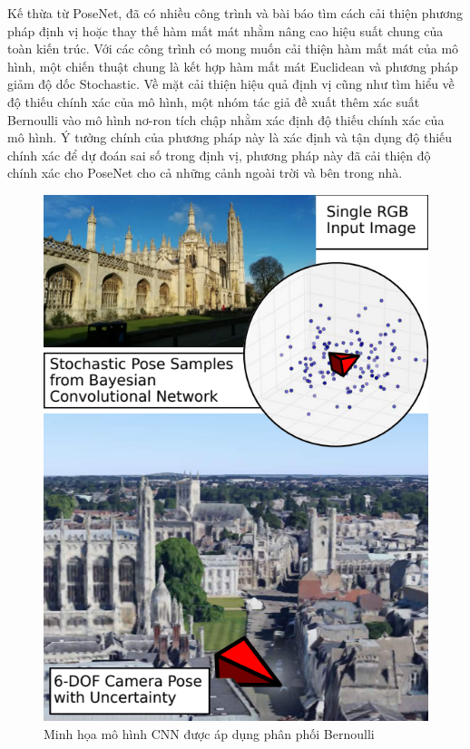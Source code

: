 Kế thừa từ PoseNet, đã có nhiều công trình và bài báo tìm cách cải thiện phương pháp định vị hoặc thay thế hàm mất mát nhằm nâng cao hiệu suất chung của toàn kiến trúc. Với các công trình có mong muốn cải thiện hàm mất mát của mô hình, một chiến thuật chung là kết hợp hàm mất mát Euclidean và phương pháp giảm độ dốc Stochastic. Về mặt cải thiện hiệu quả định vị cũng như tìm hiểu về độ thiếu chính xác của mô hình, một nhóm tác giả đề xuất thêm xác suất Bernoulli vào mô hình nơ-ron tích chập \cite{kendall2016modelling} nhằm xác định độ thiếu chính xác của mô hình. Ý tưởng chính của phương pháp này là xác định và tận dụng độ thiếu chính xác để dự đoán sai số trong định vị, phương pháp này đã cải thiện độ chính xác cho PoseNet cho cả những cảnh ngoài trời và bên trong nhà.
\begin{figure}[H]
    \centering
    \includegraphics[scale=0.7]{pics/Chapter2/Ber_PoseNet.png}
    \caption{Minh họa mô hình CNN được áp dụng phân phối Bernoulli \cite{kendall2016modelling}}
\end{figure}
